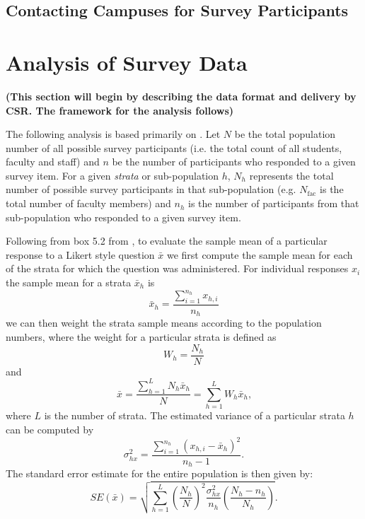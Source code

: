 \documentclass[12pt]{article} %
\begin{document}
\subsection*{Contacting Campuses for Survey Participants}




\section*{Analysis of Survey Data}

{\bf (This section will begin by describing the data format and delivery by CSR. The framework for the
  analysis follows)}

The following analysis is based primarily on \cite{Levy}. Let $N$ be the total population number of all
possible survey participants (i.e. the total count of all students, faculty and staff) and $n$ be the number
of participants who responded to a given survey item. For a given {\it strata} or sub-population $h$, $N_h$
represents the total number of possible survey participants in that sub-population (e.g. $N_{\mathrm{fac}}$ is
the total number of faculty members) and $n_h$ is the number of participants from that sub-population who
responded to a given survey item. 

Following from box 5.2 from \cite{Levy}, to evaluate the sample mean of a particular response to a Likert style
question $\bar{x}$ we first compute the sample mean for each of the strata for which the question was
administered. For individual responses $x_i$ the sample mean for a strata $\bar{x}_h$ is
\begin{equation}
\bar{x}_h=\frac{\sum\limits_{i=1}^{n_h}x_{h,i}}{n_h}
\end{equation} 
we can then weight the strata sample means according to the population numbers, where the weight for a
particular strata is defined as
\begin{equation}
W_h =\frac{N_h}{N}
\end{equation}
and
\begin{equation}
\bar{x}=\frac{\sum\limits_{h=1}^L N_h \bar{x}_h}{N}=\sum\limits_{h=1}^L W_h \bar{x}_h\mbox{,}
\end{equation}
where $L$ is the number of strata. The estimated variance of a particular strata $h$ can be computed by
\begin{equation}
\sigma^2_{hx}=\frac{\sum\limits_{i=1}^{n_h}(x_{h,i}-\bar{x}_h)^2}{n_h-1}\mbox{.}
\end{equation}
The standard error estimate for the entire population is then given by:
\begin{equation}
SE(\bar{x})=\sqrt{\sum\limits_{h=1}^L \left( \frac{N_h}{N} \right)^2\frac{\sigma^2_{hx}}{n_h} \left( \frac{N_h-n_h}{N_h} \right) }\mbox{.}
\end{equation}
\end{document}
